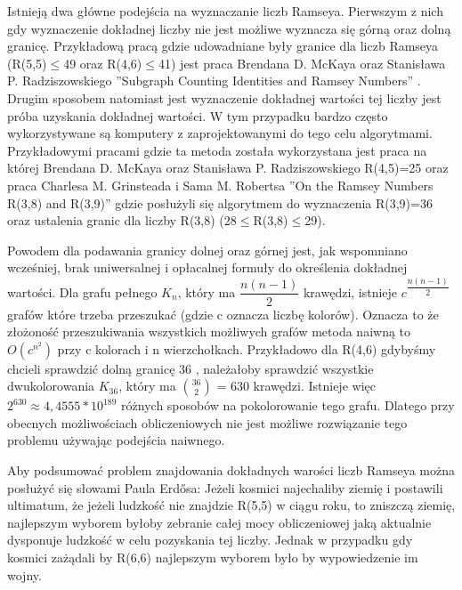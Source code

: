 \begin{enumerate}
Istnieją dwa główne podejścia na wyznaczanie liczb Ramseya. Pierwszym z nich gdy wyznaczenie dokładnej liczby nie jest możliwe wyznacza się górną oraz dolną granicę. Przykładową pracą gdzie udowadniane były granice dla liczb Ramseya (R(5,5)$\leq$49 oraz R(4,6)$\leq$41) jest praca Brendana D. McKaya oraz Stanisława P. Radziszowskiego ''Subgraph Counting Identities and Ramsey Numbers'' \cite{boundproof}. Drugim sposobem natomiast jest wyznaczenie dokładnej wartości tej liczby jest próba uzyskania dokładnej wartości. W tym przypadku bardzo często wykorzystywane są komputery z zaprojektowanymi do tego celu algorytmami. Przykładowymi pracami gdzie ta metoda została wykorzystana jest praca na której Brendana D. McKaya oraz Stanisława P. Radziszowskiego R(4,5)=25\cite{mainpaper} oraz praca Charlesa M. Grinsteada i Sama M. Robertsa ''On the Ramsey Numbers R(3,8) and R(3,9)'' gdzie posłużyli się algorytmem do wyznaczenia R(3,9)=36 oraz ustalenia granic dla liczby R(3,8) (28$\leq$R(3,8)$\leq$29)\cite{computeproof}. \par

Powodem dla podawania granicy dolnej oraz górnej jest, jak wspomniano wcześniej, brak uniwersalnej i opłacalnej formuły do określenia dokładnej wartości. Dla grafu pełnego $\mathit{K}_{n}$, który ma ${\dfrac{n(n-1)}{2}}$ krawędzi, istnieje $c^{\dfrac{n(n-1)}{2}}$ grafów które trzeba przeszukać (gdzie c oznacza liczbę kolorów). Oznacza to że złożoność przeszukiwania wszystkich możliwych grafów metoda naiwną to $O(c^{n^{2}})$ przy c kolorach i n wierzchołkach. Przykładowo dla R(4,6) gdybyśmy chcieli sprawdzić dolną granicę 36 \cite{smallramsey}, należałoby sprawdzić wszystkie dwukolorowania $\mathit{K}_{36}$, który ma ${36\choose 2}$ = 630 krawędzi. Istnieje więc $2^{630} \approx 4,4555 * 10^{189}$ różnych sposobów na pokolorowanie tego grafu. Dlatego przy obecnych możliwościach obliczeniowych nie jest możliwe rozwiązanie tego problemu używając podejścia naiwnego. \par

Aby podsumować problem znajdowania dokładnych warości liczb Ramseya można posłużyć się słowami Paula Erdősa: Jeżeli kosmici najechaliby ziemię i postawili ultimatum, że jeżeli ludzkość nie znajdzie R(5,5) w ciągu roku, to zniszczą ziemię, najlepszym wyborem byłoby zebranie całej mocy obliczeniowej jaką aktualnie dysponuje ludzkość w celu pozyskania tej liczby. Jednak w przypadku gdy kosmici zażądali by R(6,6) najlepszym wyborem było by wypowiedzenie im wojny.\cite{aliens}  \par



\end{enumerate}
